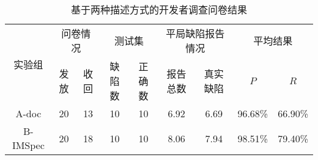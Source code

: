 \begin{table}[b]
	\centering
	\begin{minipage}[t]{\linewidth} %
		\caption{基于两种描述方式的开发者调查问卷结果}
		\label{tab:2-5-survey}
			\begin{tabular}{ccccccccc}
			\hline
			\multirow{2}{*}{实验组} & \multicolumn{2}{c}{问卷情况} & \multicolumn{2}{c}{测试集} & \multicolumn{2}{c}{平局缺陷报告情况} & \multicolumn{2}{c}{平均结果} \\
			\cline{2-9}
			& 发放 & 收回 & 缺陷数& 正确数& 报告总数 & 真实缺陷 & $P$ & $R$ \\
			\hline
		A-doc	& 20 & 13 & 10& 10& 6.92 & 6.69 & 96.68\% & 66.90\% \\
		 B-IMSpec	& 20 & 18 & 10& 10& 8.06 & 7.94 & 98.51\% & 79.40\% \\
			\hline
		\end{tabular}
	\end{minipage}
\end{table}